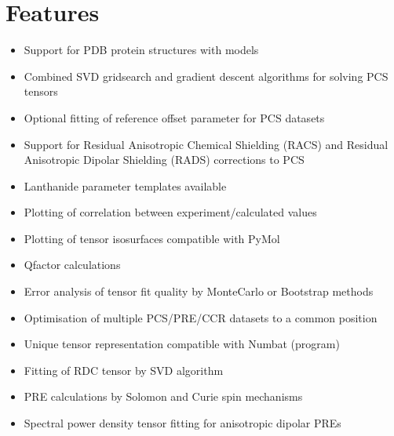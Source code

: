 \documentclass[a4paper,10pt,english,openany,oneside]{sphinxmanual}
\begin{document}
\chapter{Features}
\label{\detokenize{index:features}}\begin{itemize}
\item {} 
\sphinxAtStartPar
Support for PDB protein structures with models

\item {} 
\sphinxAtStartPar
Combined SVD gridsearch and gradient descent algorithms for solving PCS tensors

\item {} 
\sphinxAtStartPar
Optional fitting of reference offset parameter for PCS datasets

\item {} 
\sphinxAtStartPar
Support for Residual Anisotropic Chemical Shielding (RACS) and Residual Anisotropic Dipolar Shielding (RADS) corrections to PCS

\item {} 
\sphinxAtStartPar
Lanthanide parameter templates available

\item {} 
\sphinxAtStartPar
Plotting of correlation between experiment/calculated values

\item {} 
\sphinxAtStartPar
Plotting of tensor isosurfaces compatible with PyMol

\item {} 
\sphinxAtStartPar
Q\sphinxhyphen{}factor calculations

\item {} 
\sphinxAtStartPar
Error analysis of tensor fit quality by Monte\sphinxhyphen{}Carlo or Bootstrap methods

\item {} 
\sphinxAtStartPar
Optimisation of multiple PCS/PRE/CCR datasets to a common position

\item {} 
\sphinxAtStartPar
Unique tensor representation compatible with Numbat (program)

\item {} 
\sphinxAtStartPar
Fitting of RDC tensor by SVD algorithm

\item {} 
\sphinxAtStartPar
PRE calculations by Solomon and Curie spin mechanisms

\item {} 
\sphinxAtStartPar
Spectral power density tensor fitting for anisotropic dipolar PREs


\end{itemize}
\end{document}
